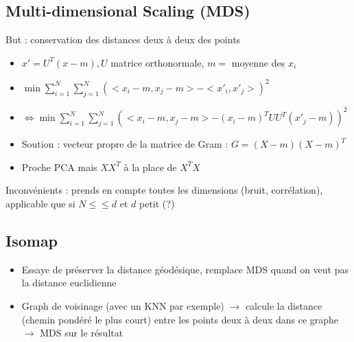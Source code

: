 \documentclass{article}
\begin{document}
\begin{multicols}{2}
\subsection{Multi-dimensional Scaling (MDS)}
But : conservation des distances deux à deux des points
\begin{itemize}
    \item $ x' = U^T(x-m), U $ matrice orthonormale, $ m = $ moyenne des $ x_i $ 
    \item $ \min \sum_{i=1}^{N} \sum_{j=1}^{N} ( < x_i - m, x_j - m> - <x'_i , x'_j> )^2 $ 
    \item $\Leftrightarrow \min \sum_{i=1}^{N} \sum_{j=1}^{N} ( < x_i - m, x_j - m> - (x_i - m )^T U U^T (x'_j - m) )^2$ 
    \item Soution : vecteur propre de la matrice de Gram : $ G = (X - m)(X - m)^T $
    \item Proche PCA mais $ XX^T $ à la place de $ X^T X $ 
\end{itemize}
Inconvénients : prends en compte toutes les dimensions (bruit, corrélation), applicable que si $ N \leq \leq d $ et $ d $ petit (?)

\subsection{Isomap}
\begin{itemize}
    \item Essaye de préserver la distance géodésique, remplace MDS quand on veut pas la distance euclidienne
    \item Graph de voisinage (avec un KNN par exemple) $\rightarrow$ calcule la distance (chemin pondéré le plus court) entre les points deux à deux dans ce graphe $\rightarrow$ MDS sur le résultat
\end{itemize}


\end{multicols}
\end{document}
